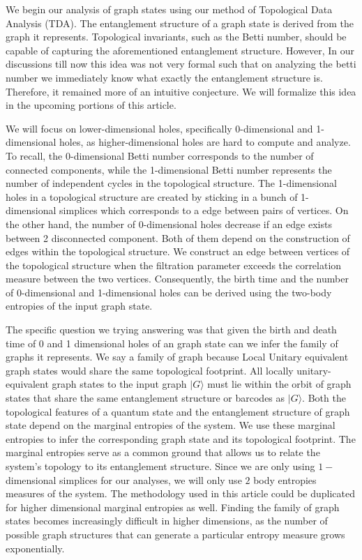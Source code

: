 \documentclass{article}
\newcommand{\ket}[1]{|#1\rangle}
\begin{document}
We begin our analysis of graph states using our method of Topological Data Analysis (TDA). The entanglement structure of a graph state is derived from the graph it represents. Topological invariants, such as the Betti number, should be capable of capturing the aforementioned entanglement structure. However, In our discussions till now this idea was not very formal such that on analyzing the betti number we immediately know what exactly the entanglement structure is. Therefore, it remained more of an intuitive conjecture. We will formalize this idea in the upcoming portions of this article.

 We will focus on lower-dimensional holes, specifically 0-dimensional and 1-dimensional holes, as higher-dimensional holes are hard to compute and analyze. To recall, the 0-dimensional Betti number corresponds to the number of connected components, while the 1-dimensional Betti number represents the number of independent cycles in the topological structure. The 1-dimensional holes in a topological structure are created by sticking in a bunch of 1-dimensional simplices which corresponds to a edge between pairs of vertices. On the other hand, the number of 0-dimensional holes decrease if an edge exists between 2 disconnected component. Both of them depend on the construction of edges within the topological structure. We construct an edge between vertices of the topological structure when the filtration parameter exceeds the correlation measure between the two vertices. Consequently, the birth time and the number of 0-dimensional and 1-dimensional holes can be derived using the two-body entropies of the input graph state.

 The specific question we trying answering was that given the birth and death time of 0 and 1 dimensional holes of an graph state can we infer the family of graphs it represents. We say a family of graph because Local Unitary equivalent graph states would share the same topological footprint. All locally unitary-equivalent graph states to the input graph $ \ket{G} $ must lie within the orbit of graph states that share the same entanglement structure or barcodes as $ \ket{G} $. Both the topological features of a quantum state and the entanglement structure of graph state depend on the marginal entropies of the system. We use these marginal entropies to infer the corresponding graph state and its topological footprint. The marginal entropies serve as a common ground that allows us to relate the system's topology to its entanglement structure. Since we are only using $1-$dimensional simplices for our analyses, we will only use $2$ body entropies measures of the system. The methodology used in this article could be duplicated for higher dimensional marginal entropies as well. Finding the family of graph states becomes increasingly difficult in higher dimensions, as the number of possible graph structures that can generate a particular entropy measure grows exponentially.
\end{document}
